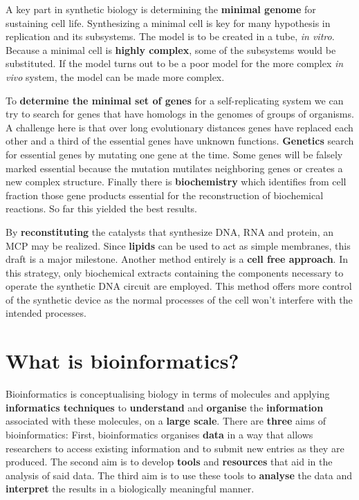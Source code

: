 \documentclass[10pt,a4paper]{article}
\begin{document}
A key part in synthetic biology is determining the \textbf{minimal genome} for sustaining cell life. 
Synthesizing a minimal cell is key for many hypothesis in replication and its subsystems. 
The model is to be created in a tube, \textit{in vitro}. 
Because a minimal cell is \textbf{highly complex}, some of the subsystems would be substituted. 
If the model turns out to be a poor model for the more complex \textit{in vivo} system,  the model can be made more complex.

To \textbf{determine the minimal set of genes} for a self-replicating system we can try to search for genes that have homologs in the genomes of groups of organisms. 
A challenge here is that over long evolutionary distances genes have replaced each other and a third of the essential genes have unknown functions. 
\textbf{Genetics} search for essential genes by mutating one gene at the time. 
Some genes will be falsely marked essential because the mutation mutilates neighboring genes or creates a new complex structure.
Finally there is \textbf{biochemistry} which identifies from cell fraction those gene products essential for the reconstruction of biochemical reactions. 
So far this yielded the best results.

By \textbf{reconstituting} the catalysts that synthesize DNA, RNA and protein, an MCP may be realized. 
Since \textbf{lipids} can be used to act as simple membranes, this draft is a major milestone.
Another method entirely is a \textbf{cell free approach}. 
In this strategy, only biochemical extracts containing the components necessary to operate the synthetic DNA circuit are employed. 
This method offers more control of the synthetic device as the normal processes of the cell won’t interfere with the intended processes.

\newpage
\section{What is bioinformatics?}

Bioinformatics is conceptualising biology in terms of molecules and applying \textbf{informatics techniques} to \textbf{understand} and \textbf{organise} the \textbf{information} associated with these molecules, on a \textbf{large scale}. There are \textbf{three} aims of bioinformatics: First, bioinformatics organises \textbf{data} in a way that allows researchers to access existing information and to submit new entries as they are produced. The second aim is to develop \textbf{tools} and \textbf{resources} that aid in the analysis of said data. The third aim is to use these tools to \textbf{analyse} the data and \textbf{interpret} the results in a biologically meaningful manner.
\end{document}
